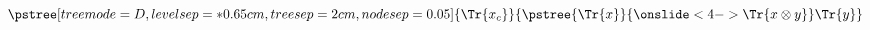 $\displaystyle
\pstree[treemode=\CItreemode,levelsep=*0.65cm,treesep=\CItreesep,nodesep=0.05]
{
	\Tr{x_c}
}
{
   \pstree
	{
	   \Tr{x}
	}
	{
		\onslide<4->{\Tr{x \cross y}}
	}
	\Tr{y}
}
$